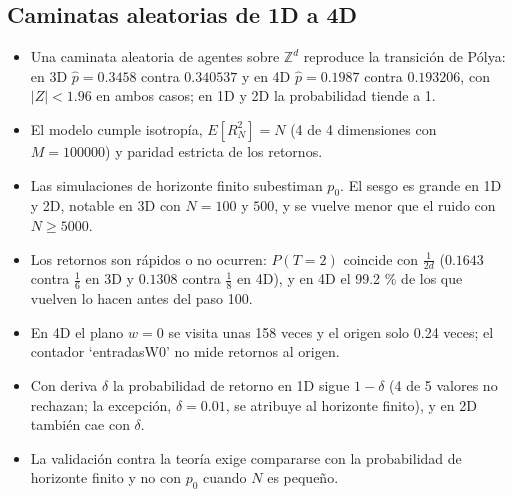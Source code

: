\documentclass{article}
\begin{document}
\subsection{Caminatas aleatorias de 1D a 4D}
\begin{itemize}
    \item Una caminata aleatoria de agentes sobre $\mathbb{Z}^d$ reproduce la transición de Pólya: en 3D $\hat p=0.3458$ contra $0.340537$ y en 4D $\hat p=0.1987$ contra $0.193206$, con $|Z|<1.96$ en ambos casos; en 1D y 2D la probabilidad tiende a 1.
    \item El modelo cumple isotropía, $E[R_N^2]=N$ (4 de 4 dimensiones con $M=100000$) y paridad estricta de los retornos.
    \item Las simulaciones de horizonte finito subestiman $p_0$. El sesgo es grande en 1D y 2D, notable en 3D con $N=100$ y $500$, y se vuelve menor que el ruido con $N\geq5000$.
    \item Los retornos son rápidos o no ocurren: $P(T=2)$ coincide con $\frac{1}{2d}$ ($0.1643$ contra $\frac16$ en 3D y $0.1308$ contra $\frac18$ en 4D), y en 4D el 99.2 \% de los que vuelven lo hacen antes del paso 100.
    \item En 4D el plano $w=0$ se visita unas 158 veces y el origen solo 0.24 veces; el contador `entradasW0' no mide retornos al origen.
    \item Con deriva $\delta$ la probabilidad de retorno en 1D sigue $1-\delta$ (4 de 5 valores no rechazan; la excepción, $\delta=0.01$, se atribuye al horizonte finito), y en 2D también cae con $\delta$.
    \item La validación contra la teoría exige compararse con la probabilidad de horizonte finito y no con $p_0$ cuando $N$ es pequeño.
\end{itemize}
\end{document}
